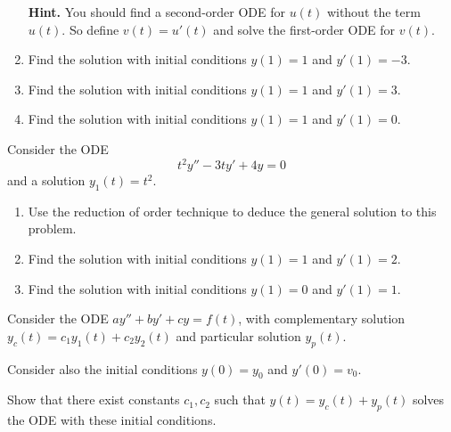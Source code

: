 \begin{exercises}
\begin{problist}
\begin{enumerate}
		\item[\bf Hint.] You should find a second-order ODE for $u(t)$ without the term $u(t)$. So define $v(t) = u'(t)$ and solve the first-order ODE for $v(t)$.
		
		


		
		
		\item Find the solution with initial conditions $y(1)=1$ and $y'(1)=-3$.
		\item Find the solution with initial conditions $y(1)=1$ and $y'(1)=3$.
		\item Find the solution with initial conditions $y(1)=1$ and $y'(1)=0$.
	\end{enumerate}


	\prob Consider the ODE
	$$
	t^2 y'' - 3 t y' + 4 y = 0
	$$
	and a solution $y_1(t) = t^2$.
	
	\begin{enumerate}
		\item Use the reduction of order technique to deduce the general solution to this problem.
		
	
		
		\item Find the solution with initial conditions $y(1)=1$ and $y'(1)=2$.
		\item Find the solution with initial conditions $y(1)=0$ and $y'(1)=1$.
	\end{enumerate}



	
	\prob Consider the ODE $a y'' +by'+cy = f(t)$, with complementary solution $y_c(t) =c_1 y_1(t) + c_2 y_2(t)$ and particular solution $y_p(t)$.
	
	Consider also the initial conditions $y(0)=y_0$ and $y'(0)=v_0$.
	
	Show that there exist constants $c_1, c_2$ such that $y(t) = y_c(t) + y_p(t)$ solves the ODE with these initial conditions.
	
	\end{problist}
\end{exercises}
